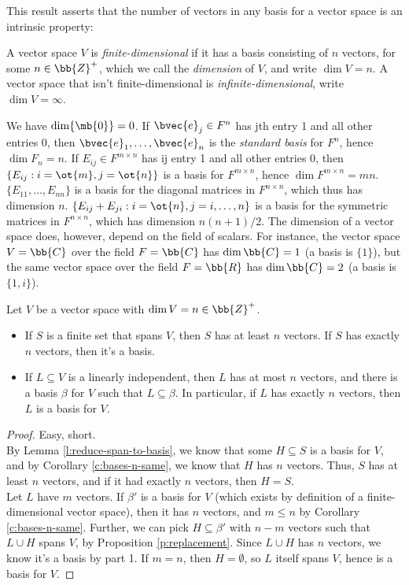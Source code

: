 This result asserts that the number of vectors in any basis for a vector space is an intrinsic property:
\begin{defn}
A vector space $V$ is \emph{finite-dimensional} if it has a basis consisting of $n$ vectors, for some $n \in \bb{Z}^+$, which we call the \emph{dimension} of $V$, and write $\dim V=n$. A vector space that isn't finite-dimensional is \emph{infinite-dimensional}, write $\dim V= \infty$.
\end{defn}
\begin{example}\label{ex:dim-basis}
We have $\dim \{ \mb{0}\}=0$.
If $\bvec{e}_j \in F^n$ has jth entry 1 and all other entries 0, then $\bvec{e}_1, \ldots, \bvec{e}_n$ is the \emph{standard basis} for $F^n$, hence $\dim F_n=n$.
If $E_{ij}\in F^{m \times n}$ has ij entry 1 and all other entries 0, then $\{ E_{ij}:i=\ot{m},j=\ot{n}\}$ is a basis for $F^{m \times n}$, hence $\dim F^{m \times n}=mn$.\\
$\{ E_{11}, \ldots, E_{nn}\}$ is a basis for the diagonal matrices in $F^{n \times n}$, which thus has dimension $n$. $\{ E_{ij}+E_{ji}:i= \ot{n},j=i, \ldots,n \}$ is a basis for the symmetric matrices in $F^{n \times n}$, which has dimension $n(n+1)/2$.
The dimension of a vector space does, however, depend on the field of scalars. For instance, the vector space $V= \bb{C}$ over the field $F= \bb{C}$ has $\dim \bb{C}=1$ (a basis is $\{ 1\}$), but the same vector space over the field $F= \bb{R}$ has $\dim \bb{C}=2$ (a basis is $\{ 1,i\}$).
\end{example}
\begin{corollary}\label{c:extend-LID2basis}
Let $V$ be a vector space with $\dim V=n \in \bb{Z}^+$.
\begin{itemize}
\item If $S$ is a finite set that spans $V$, then $S$ has at least $n$ vectors. If $S$ has exactly $n$ vectors, then it's a basis.
\item If $L \subseteq V$ is a linearly independent, then $L$ has at most $n$ vectors, and there is a basis $\beta$ for $V$ such that $L \subseteq \beta$. In particular, if $L$ has exactly $n$ vectors, then $L$ is a basis for $V$.
\end{itemize}
\end{corollary}
\begin{proof}
Easy, short.\\
By Lemma \ref{l:reduce-span-to-basis}, we know that some $H \subseteq S$ is a basis for $V$, and by Corollary \ref{c:bases-n-same}, we know that $H$ has $n$ vectors. Thus, $S$ has at least $n$ vectors, and if it had exactly $n$ vectors, then $H=S$.\\
Let $L$ have $m$ vectors. If $\beta'$ is a basis for $V$ (which exists by definition of a finite-dimensional vector space), then it has $n$ vectors, and $m \leq n$ by Corollary \ref{c:bases-n-same}.
Further, we can pick $H \subseteq \beta'$ with $n-m$ vectors such that $L \cup H$ spans $V$, by Proposition \ref{p:replacement}. Since $L \cup H$ has $n$ vectors, we know it's a basis by part 1. If $m=n$, then $H= \emptyset$, so $L$ itself spans $V$, hence is a basis for $V$.
\end{proof}
